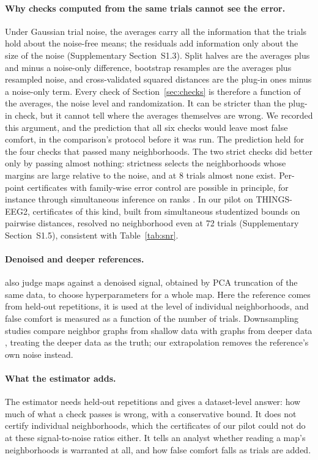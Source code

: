\paragraph{Why checks computed from the same trials cannot see the error.} Under Gaussian trial
noise, the averages carry all the information that the trials hold about the noise-free means; the
residuals add information only about the size of the noise (Supplementary Section~S1.3). Split
halves are the averages plus and minus a noise-only difference, bootstrap resamples are the averages
plus resampled noise, and cross-validated squared distances are the plug-in ones minus a noise-only
term. Every check of Section~\ref{sec:checks} is therefore a function of the averages, the noise
level and randomization. It can be stricter than the plug-in check, but it cannot tell where the
averages themselves are wrong. We recorded this argument, and the prediction that all six checks
would leave most false comfort, in the comparison's protocol before it was run. The prediction held
for the four checks that passed many neighborhoods. The two strict checks did better only by
passing almost nothing: strictness selects the neighborhoods whose margins are large relative to
the noise, and at 8 trials almost none exist. Per-point certificates with family-wise error
control are possible in principle, for instance through simultaneous inference on ranks
\citep{mogstad2024}. In our pilot on THINGS-EEG2, certificates of this kind, built from simultaneous
studentized bounds on pairwise distances, resolved no neighborhood even at 72 trials
(Supplementary Section~S1.5), consistent with Table~\ref{tab:snr}.

\paragraph{Denoised and deeper references.} \citet{lin2024} also judge maps against a denoised
signal, obtained by PCA truncation of the same data, to choose hyperparameters for a whole map. Here
the reference comes from held-out repetitions, it is used at the level of individual neighborhoods,
and false comfort is measured as a function of the number of trials. Downsampling studies compare
neighbor graphs from shallow data with graphs from deeper data \citep{ahlmann2023}, treating the
deeper data as the truth; our extrapolation removes the reference's own noise instead.

\paragraph{What the estimator adds.} The estimator needs held-out repetitions and gives a
dataset-level answer: how much of what a check passes is wrong, with a conservative bound. It does
not certify individual neighborhoods, which the certificates of our pilot could not do at these
signal-to-noise ratios either. It tells an analyst whether reading a map's neighborhoods is
warranted at all, and how false comfort falls as trials are added.
